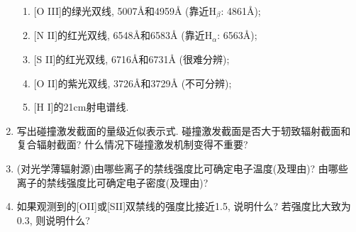 \begin{enumerate}
{\begin{enumerate}
            \item $\text{}$[O III]的绿光双线, 5007\AA{}和4959\AA{} (靠近H${}_\beta$: 4861\AA);
            \item $\text{}$[N II]的红光双线, 6548\AA{}和6583\AA{} (靠近H${}_\alpha$: 6563\AA);
            \item $\text{}$[S II]的红光双线, 6716\AA{}和6731\AA{} (很难分辨);
            \item $\text{}$[O II]的紫光双线, 3726\AA{}和3729\AA{} (不可分辨);
            \item $\text{}$[H I]的21cm射电谱线.
        \end{enumerate}
    }
    \item 写出碰撞激发截面的量级近似表示式. 碰撞激发截面是否大于轫致辐射截面和复合辐射截面? 什么情况下碰撞激发机制变得不重要?
    \item (对光学薄辐射源)由哪些离子的禁线强度比可确定电子温度(及理由)? 由哪些离子的禁线强度比可确定电子密度(及理由)?
    \item 如果观测到的[OII]或[SII]双禁线的强度比接近1.5, 说明什么? 若强度比大致为0.3, 则说明什么?
\end{enumerate}
